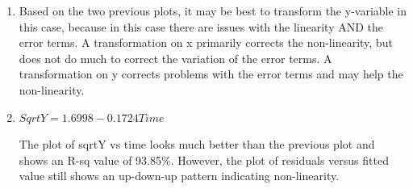 \documentclass{article}
\begin{document}
\begin{enumerate}
\def\labelenumi{\alph{enumi})}
\setcounter{enumi}{2}
\item
  Based on the two previous plots, it may be best to transform the
  y-variable in this case, because in this case there are issues with
  the linearity AND the error terms. A transformation on x primarily
  corrects the non-linearity, but does not do much to correct the
  variation of the error terms. A transformation on y corrects problems
  with the error terms and may help the non-linearity.
  
  \newpage
\item
  \(SqrtY = 1.6998 - 0.1724 Time\)
  
  \begin{figure}[!h]
  \begin{floatrow}
  \end{floatrow}
\end{figure}

The plot of sqrtY vs time looks much better than the previous plot and
shows an R-sq value of 93.85\%. However, the plot of residuals versus
fitted value still shows an up-down-up pattern indicating non-linearity.
  
\end{enumerate}
\end{document}
